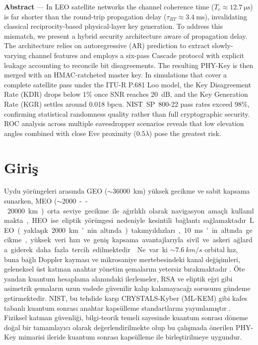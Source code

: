 \documentclass[conference,a4paper]{IEEEtran}
\begin{document}
\vspace{0.5em}
\noindent\textbf{Abstract} --- In LEO satellite networks the channel coherence time ($T_c \approx \SI{12.7}{\micro\second}$) is far shorter than the round-trip propagation delay ($\tau_{RT} \approx \SI{3.4}{\milli\second}$), invalidating classical reciprocity-based physical-layer key generation. To address this mismatch, we present a hybrid security architecture aware of propagation delay. The architecture relies on autoregressive (AR) prediction to extract slowly-varying channel features and employs a six-pass Cascade protocol with explicit leakage accounting to reconcile bit disagreements. The resulting PHY-Key is then merged with an HMAC-ratcheted master key. In simulations that cover a complete satellite pass under the ITU-R P.681 Loo model, the Key Disagreement Rate (KDR) drops below 1\% once SNR reaches 20~dB, and the Key Generation Rate (KGR) settles around 0.018 bpcu. NIST~SP~800-22 pass rates exceed 98\%, confirming statistical randomness quality rather than full cryptographic security. ROC analysis across multiple eavesdropper scenarios reveals that low elevation angles combined with close Eve proximity ($0.5\lambda$) pose the greatest risk.

\section{Giriş}

Uydu yörüngeleri arasında GEO ($\sim$\SI{36000}{km}) yüksek gecikme ve sabit kapsama sunarken, MEO ($\sim$\SI{2000}--\SI{20000}{km}) orta seviye gecikme ile ağırlıklı olarak navigasyon amaçlı kullanılmakta, HEO ise eliptik yörüngesi nedeniyle kesintili bağlantı sağlamaktadır. LEO (yaklaşık \SI{2000}{km}'nin altında) takımyıldızları, \SI{10}{\milli\second}'in altında gecikme, yüksek veri hızı ve geniş kapsama avantajlarıyla sivil ve askeri ağlarda giderek daha fazla tercih edilmektedir \cite{tua,3gpp}. Ne var ki $\sim\SI{7.6}{km/s}$ orbital hız, buna bağlı Doppler kayması ve mikrosaniye mertebesindeki kanal değişimleri, geleneksel üst katman anahtar yönetim şemalarını yetersiz bırakmaktadır \cite{wyner,bloch,poor_schaefer}. Öte yandan kuantum hesaplama alanındaki ilerlemeler, RSA ve eliptik eğri gibi asimetrik şemaların uzun vadede güvenilir kalıp kalamayacağı sorusunu gündeme getirmektedir. NIST, bu tehdide karşı CRYSTALS-Kyber (ML-KEM) gibi kafes tabanlı kuantum sonrası anahtar kapsülleme standartlarını yayımlamıştır \cite{nist_pqc}. Fiziksel katman güvenliği, bilgi-teorik temeli sayesinde kuantum sonrası döneme doğal bir tamamlayıcı olarak değerlendirilmekte olup bu çalışmada önerilen PHY-Key mimarisi ileride kuantum sonrası kapsülleme ile birleştirilmeye uygundur.
\end{document}
